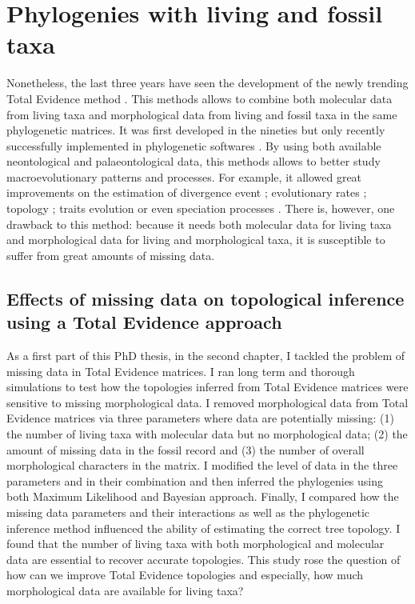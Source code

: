 \section{Phylogenies with living and fossil taxa}
Nonetheless, the last three years have seen the development of the newly trending Total Evidence method \citep{ronquista2012,slaterphylogenetic2013,Wood01032013,schragocombining2013,beckancient2014,Arcila2015131,Dembo2015}.
This methods allows to combine both molecular data from living taxa and morphological data from living and fossil taxa in the same phylogenetic matrices.
It was first developed in the nineties \citep{eernissetaxonomic1993} but only recently successfully implemented in phylogenetic softwares \citep{Ronquist2012mrbayes,BEAST2}.
By using both available neontological and palaeontological data, this methods allows to better study macroevolutionary patterns and processes.
For example, it allowed great improvements on the estimation of divergence event \citep[e.g.][]{ronquista2012}; evolutionary rates \citep[e.g.][]{beckancient2014}; topology \citep[e.g.][]{Dembo2015}; traits evolution \citep[e.g.][]{slaterphylogenetic2013} or even speciation processes \citep[e.g.][]{Wood01032013}.
There is, however, one drawback to this method: because it needs both molecular data for living taxa and morphological data for living and morphological taxa, it is susceptible to suffer from great amounts of missing data.

\subsection{Effects of missing data on topological inference using a Total Evidence approach}
As a first part of this PhD thesis, in the second chapter, I tackled the problem of missing data in Total Evidence matrices.
I ran long term and thorough simulations to test how the topologies inferred from Total Evidence matrices were sensitive to missing morphological data.
I removed morphological data from Total Evidence matrices via three parameters where data are potentially missing: (1) the number of living taxa with molecular data but no morphological data; (2) the amount of missing data in the fossil record and (3) the number of overall morphological characters in the matrix.
I modified the level of data in the three parameters and in their combination and then inferred the phylogenies using both Maximum Likelihood and Bayesian approach.
Finally, I compared how the missing data parameters and their interactions as well as the phylogenetic inference method influenced the ability of estimating the correct tree topology.
I found that the number of living taxa with both morphological and molecular data are essential to recover accurate topologies.
This study rose the question of how can we improve Total Evidence topologies and especially, how much morphological data are available for living taxa?

